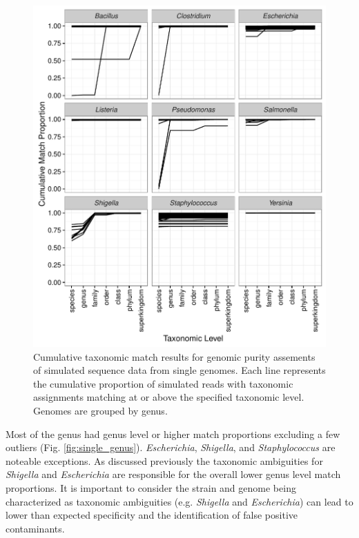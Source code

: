 \documentclass[fleqn,10pt,lineno]{wlpeerj}\usepackage[]{graphicx}\usepackage[]{color}
\makeatletter
\def\maxwidth{ %
  \ifdim\Gin@nat@width>\linewidth
    \linewidth
  \else
    \Gin@nat@width
  \fi
}
\newenvironment{knitrout}{}{} %
\makeatother
\begin{document}
\begin{knitrout}
\color{fgcolor}\begin{figure}

{\centering \includegraphics[width=\maxwidth]{figure/single_org_cum-1} 

}

\caption[Cumulative taxonomic match results for genomic purity assements of simulated sequence data from single genomes]{Cumulative taxonomic match results for genomic purity assements of simulated sequence data from single genomes.  Each line represents the cumulative proportion of simulated reads with taxonomic assignments matching at or above the specified taxonomic level. Genomes are grouped by genus.}\label{fig:single_org_cum}
\end{figure}


\end{knitrout}


Most of the genus had genus level or higher match proportions excluding a few outliers (Fig. \ref{fig:single_genus}). 
\textit{Escherichia}, \textit{Shigella}, and \textit{Staphylococcus} are noteable exceptions. 
As discussed previously the taxonomic ambiguities for \textit{Shigella} and \textit{Escherichia} are responsible for the overall lower genus level match proportions. 
It is important to consider the strain and genome being characterized as taxonomic ambiguities (e.g. \textit{Shigella} and \textit{Escherichia}) can lead to lower than expected specificity and the identification of false positive contaminants.  
\end{document}
